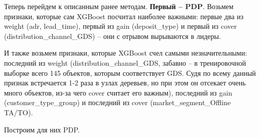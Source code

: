 Теперь перейдем к описанным ранее методам. \textbf{Первый -- PDP}. Возьмем признаки, которые сам XGBoost посчитал наиболее важными: первые два из weight (adr, lead\_time), первый из gain (deposit\_type) и первый из cover (distribution\_channel\_GDS) -- они с отрывом вырываются в лидеры.

И также возьмем признаки, которые XGBoost счел самыми незначительными: последний из weight (distribution\_channel\_GDS, забавно -- в тренировочной выборке всего 145 объектов, которым соответствует GDS. Судя по всему данный признак встречается 1-2 раза в узлах деревьев, но при этом он отсекает очень много объектов, из-за чего cover считает его важным), последний из gain (customer\_type\_group) и последний из cover (market\_segment\_Offline TA/TO).

Построим для них PDP.

